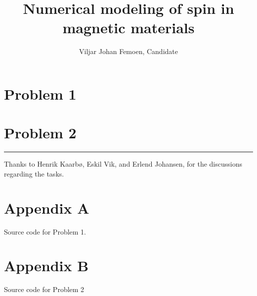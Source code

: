 \documentclass{labreport}
\title{Numerical modeling of spin in magnetic materials}
\author{Viljar Johan Femoen, Candidate \candnum}
\begin{document}
\maketitle

\section{Problem 1}


\newpage
\section{Problem 2}









\begin{center}
    \rule{2cm}{.4pt}
\end{center}
Thanks to Henrik Kaarbø, Eskil Vik, and Erlend Johansen,
for the discussions regarding the tasks.

\onecolumn
\section{Appendix A}
Source code for Problem 1.
\href{
    https://www.github.com/viljarjf/nano/tree/main/TFY4235_numfys/2
    }{\color{blue}{The GitHub source can be found here}}



\newpage
\section{Appendix B}
Source code for Problem 2
\href{
    https://www.github.com/viljarjf/nano/tree/main/TFY4235_numfys/exam
    }{\color{blue}{The GitHub source can be found here}}



\makeatletter
{}
\makeatother
\nocite{*}
\printbibliography
\end{document}
